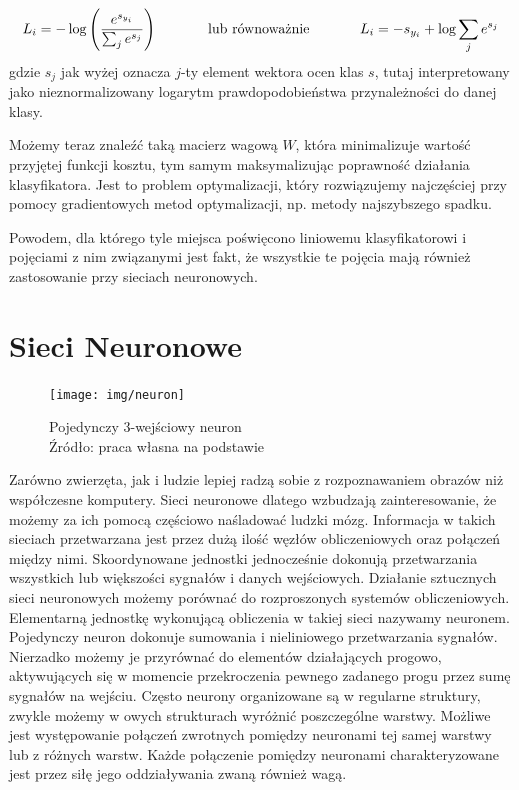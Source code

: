 \begin{equation}\label{eqn:single_loss_softmax}
L_i = -\log\left(\frac{e^{s_{y_i}}}{ \sum_j e^{s_j} }\right) \hspace{0.5in} \text{lub równoważnie} \hspace{0.5in} L_i = -s_{y_i} + \log\sum_j e^{s_j}
\end{equation}
gdzie $s_j$ jak wyżej oznacza $j$-ty element wektora ocen klas $s$, tutaj interpretowany jako nieznormalizowany logarytm prawdopodobieństwa przynależności do danej klasy.

Możemy teraz znaleźć taką macierz wagową $W$, która minimalizuje wartość przyjętej funkcji kosztu, tym samym maksymalizując poprawność działania klasyfikatora.
Jest to problem optymalizacji, który rozwiązujemy najczęściej przy pomocy gradientowych metod optymalizacji, np. metody najszybszego spadku. \cite{cs231n}

Powodem, dla którego tyle miejsca poświęcono liniowemu klasyfikatorowi i pojęciami z nim związanymi jest fakt, że wszystkie te pojęcia mają również zastosowanie przy sieciach neuronowych.

\section{Sieci Neuronowe}\label{sec:nn}

\begin{figure}[h!tb]
	 \centering
	 \texttt{[image: img/neuron]}
	 \caption{Pojedynczy 3-wejściowy neuron \\
              Źródło: praca własna na podstawie \cite{cs231n,zuradabarskijedruch1996}}
	 \label{fig:neuron}
\end{figure}

Zarówno zwierzęta, jak i ludzie lepiej radzą sobie z rozpoznawaniem obrazów niż współczesne komputery.
Sieci neuronowe dlatego wzbudzają zainteresowanie, że możemy za ich pomocą częściowo naśladować ludzki mózg.
Informacja w takich sieciach przetwarzana jest przez dużą ilość węzłów obliczeniowych oraz połączeń między nimi.
Skoordynowane jednostki jednocześnie dokonują przetwarzania wszystkich lub większości sygnałów i danych wejściowych.
Działanie sztucznych sieci neuronowych możemy porównać do rozproszonych systemów obliczeniowych.
Elementarną jednostkę wykonującą obliczenia w takiej sieci nazywamy neuronem.
Pojedynczy neuron dokonuje sumowania i nieliniowego przetwarzania sygnałów.
Nierzadko możemy je przyrównać do elementów działających progowo, aktywujących się w momencie przekroczenia pewnego zadanego progu przez sumę sygnałów na wejściu.
Często neurony organizowane są w regularne struktury, zwykle możemy w owych strukturach wyróżnić poszczególne warstwy.
Możliwe jest występowanie połączeń zwrotnych pomiędzy neuronami tej samej warstwy lub z różnych warstw.
Każde połączenie pomiędzy neuronami charakteryzowane jest przez siłę jego oddziaływania zwaną również wagą. \cite{zuradabarskijedruch1996}

